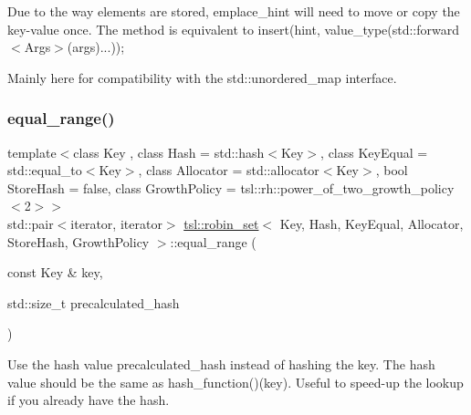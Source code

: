Due to the way elements are stored, emplace\+\_\+hint will need to move or copy the key-\/value once. The method is equivalent to insert(hint, value\+\_\+type(std\+::forward$<$\+Args$>$(args)...));

Mainly here for compatibility with the std\+::unordered\+\_\+map interface. \mbox{\label{classtsl_1_1robin__set_a1c863ebce6a1bc4c2ad69e67f1331661}} 
\subsubsection{\texorpdfstring{equal\_range()}{equal\_range()}\hspace{0.1cm}{\footnotesize\ttfamily [1/6]}}
{\footnotesize\ttfamily template$<$class Key , class Hash  = std\+::hash$<$\+Key$>$, class Key\+Equal  = std\+::equal\+\_\+to$<$\+Key$>$, class Allocator  = std\+::allocator$<$\+Key$>$, bool Store\+Hash = false, class Growth\+Policy  = tsl\+::rh\+::power\+\_\+of\+\_\+two\+\_\+growth\+\_\+policy$<$2$>$$>$ \\
std\+::pair$<$iterator, iterator$>$ \mbox{\hyperlink{classtsl_1_1robin__set}{tsl\+::robin\+\_\+set}}$<$ Key, Hash, Key\+Equal, Allocator, Store\+Hash, Growth\+Policy $>$\+::equal\+\_\+range (\begin{DoxyParamCaption}\item[{const Key \&}]{key,  }\item[{std\+::size\+\_\+t}]{precalculated\+\_\+hash }\end{DoxyParamCaption})\hspace{0.3cm}{\ttfamily [inline]}}

Use the hash value \textquotesingle{}precalculated\+\_\+hash\textquotesingle{} instead of hashing the key. The hash value should be the same as hash\+\_\+function()(key). Useful to speed-\/up the lookup if you already have the hash. \mbox{\label{classtsl_1_1robin__set_a2c006d03e4786428ad08a543cc052170}} 
